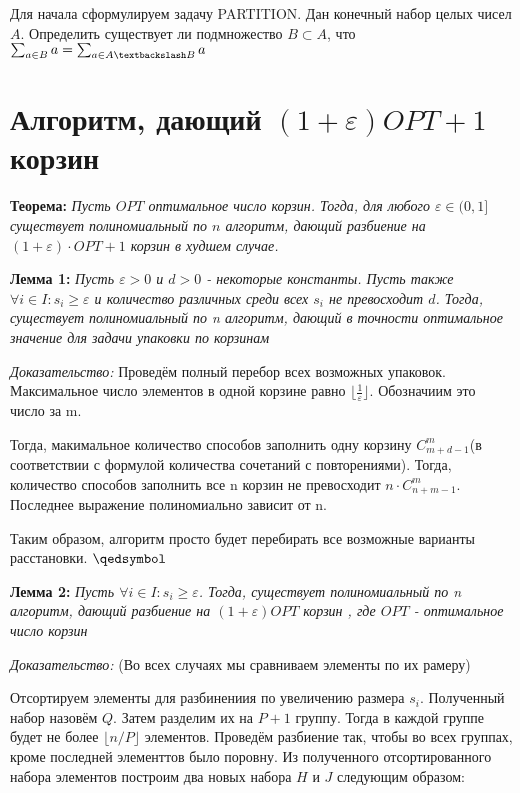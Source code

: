 \documentclass[a4paper,14pt,russian]{article}
\begin{document}
Для начала сформулируем задачу PARTITION. Дан конечный набор целых чисел $A$. Определить существует ли подмножество $B \subset A$, что $\sum_{a \in B} a = \sum_{a \in {A \textbackslash B}} a$


\newpage
\section {Алгоритм, дающий $(1 + \varepsilon)OPT + 1$ корзин}

{\bf Теорема:} \textit{Пусть $OPT$ оптимальное число корзин. Тогда, для любого $\varepsilon \in (0, 1]$ существует полиномиальный по $n$ алгоритм, дающий разбиение на $(1 + \varepsilon) \cdot OPT + 1$ корзин в худшем случае.}

{\bf Лемма 1:} \textit{Пусть $\varepsilon > 0$ и $d > 0$ - некоторые константы. Пусть также $\forall i \in I: s_i \geq \varepsilon$ и количество различных среди всех $s_i$ не превосходит $d$. Тогда, существует полиномиальный по n алгоритм, дающий в точности оптимальное значение для задачи упаковки по корзинам}

\textit{Доказательство:} Проведём полный перебор всех возможных упаковок. Максимальное число элементов в одной корзине равно $\lfloor{\frac{1}{\varepsilon}\rfloor}$. Обозначиим это число за m. 

Тогда, макимальное количество способов заполнить одну корзину $C_{m+d-1}^{m}$(в соответствии с формулой количества сочетаний с повторениями). Тогда, количество способов заполнить все n корзин не превосходит $n \cdot C_{n+m-1}^{m}$. Последнее выражение полиномиально зависит от n.

Таким образом, алгоритм просто будет перебирать все возможные варианты расстановки.
$\qedsymbol$

{\bf Лемма 2:} \textit{Пусть $\forall i \in I: s_i \geq \varepsilon$. Тогда, существует полиномиальный по n алгоритм, дающий разбиение на $(1 + \varepsilon)OPT$ корзин , где $OPT$ - оптимальное число корзин}

\textit{Доказательство:} (Во всех случаях мы сравниваем элементы по их рамеру)

Отсортируем элементы для разбинениия по увеличению размера $s_i$. Полученный набор назовём $Q$. Затем разделим их на $P + 1$ группу. Тогда в каждой группе будет не более $\lfloor{n/P\rfloor}$ элементов. Проведём разбиение так, чтобы во всех группах, кроме последней элементтов было поровну. Из полученного отсортированного набора элементов построим два новых набора $H$ и $J$ следующим образом: 
\end{document}
